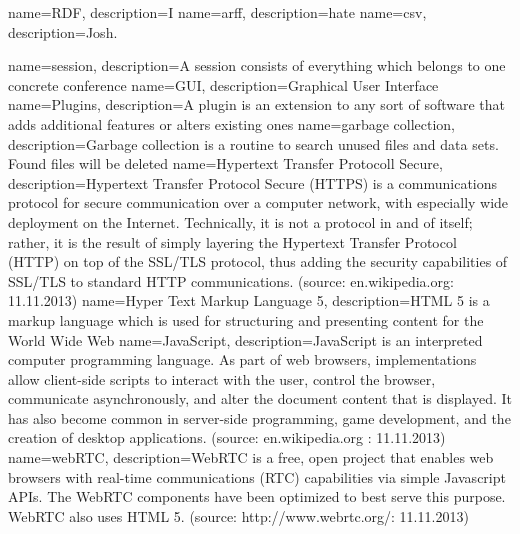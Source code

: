 {
name=RDF,
description={I}
}
{
name=arff,
description={hate}
}
{
name=csv,
description={Josh.}
}








{
	name=session,
	description={A session consists of everything which belongs to one concrete conference}
}
{	
	name=GUI,
	description={Graphical User Interface}
}
{
	name=Plugins,
	description={A plugin is an extension to any sort of software that adds additional features or alters existing ones}
}
{
name=garbage collection,
description={Garbage collection is a routine to search unused files and data sets. Found files will be deleted}
}
{
name=Hypertext Transfer Protocoll Secure,
description={Hypertext Transfer Protocol Secure (HTTPS) is a communications protocol for secure communication over a computer network, with especially wide deployment on the Internet. Technically, it is not a protocol in and of itself; rather, it is the result of simply layering the Hypertext Transfer Protocol (HTTP) on top of the SSL/TLS protocol, thus adding the security capabilities of SSL/TLS to standard HTTP communications. (source: en.wikipedia.org: 11.11.2013)}
}
{
name=Hyper Text Markup Language 5,
description={HTML 5 is a markup language which is used for structuring and presenting content for the World Wide Web}
}
{
name=JavaScript,
description={JavaScript is an interpreted computer programming language. As part of web browsers, implementations allow client-side scripts to interact with the user, control the browser, communicate asynchronously, and alter the document content that is displayed. It has also become common in server-side programming, game development, and the creation of desktop applications. (source: en.wikipedia.org : 11.11.2013)}
}
{
name=webRTC,
description={WebRTC is a free, open project that enables web browsers with real-time communications (RTC) capabilities via simple Javascript APIs. The WebRTC components have been optimized to best serve this purpose. WebRTC also uses HTML 5. (source: http://www.webrtc.org/: 11.11.2013)}
}


